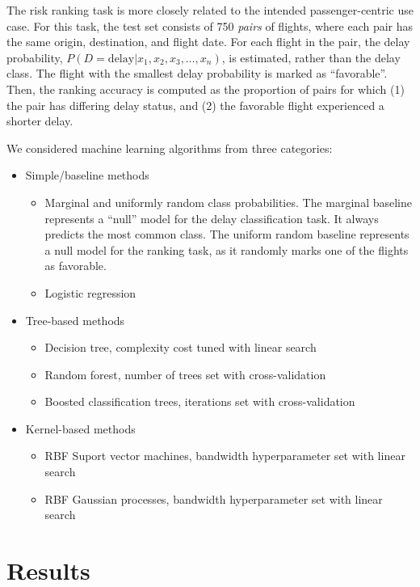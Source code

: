 \documentclass{article}
\begin{document}
The risk ranking task is more closely related to the intended passenger-centric use case. For this task, the test set consists of 750 \emph{pairs} of flights, where each pair has the same origin, destination, and flight date. For each flight in the pair, the delay probability, $P(D=\text{delay}|x_1, x_2, x_3, \ldots, x_n)$, is estimated, rather than the delay class. The flight with the smallest delay probability is marked as ``favorable''. Then, the ranking accuracy is computed as the proportion of pairs for which (1) the pair has differing delay status, and (2) the favorable flight experienced a shorter delay.

We considered machine learning algorithms from three categories:
\begin{itemize}
    \item Simple/baseline methods
    \begin{itemize}
        \item Marginal and uniformly random class probabilities. The marginal baseline represents a ``null'' model for the delay classification task. It always predicts the most common class. The uniform random baseline represents a null model for the ranking task, as it randomly marks one of the flights as favorable.
        \item Logistic regression

    \end{itemize}
    \item Tree-based methods
    \begin{itemize}
        \item Decision tree, complexity cost tuned with linear search
        \item Random forest, number of trees set with cross-validation
        \item Boosted classification trees, iterations set with cross-validation
    \end{itemize}
    \item Kernel-based methods
    \begin{itemize}
        \item RBF Suport vector machines, bandwidth hyperparameter set with linear search
        \item RBF Gaussian processes, bandwidth hyperparameter set with linear search
    \end{itemize}
\end{itemize}

\section{Results}
\label{sec:results}
\end{document}
